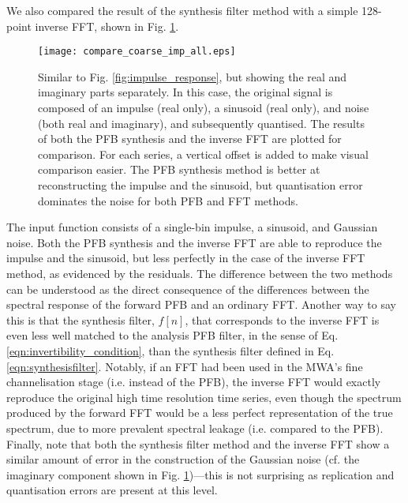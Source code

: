 \documentclass{pasa}%
\begin{document}
We also compared the result of the synthesis filter method with a simple 128-point inverse FFT, shown in Fig. \ref{fig:imp_sin_noise}.
\begin{figure}
    \centering
    \texttt{[image: compare\_coarse\_imp\_all.eps]}
    \caption{Similar to Fig. \ref{fig:impulse_response}, but showing the real and imaginary parts separately. In this case, the original signal is composed of an impulse (real only), a sinusoid (real only), and noise (both real and imaginary), and subsequently quantised. The results of both the PFB synthesis and the inverse FFT are plotted for comparison. For each series, a vertical offset is added to make visual comparison easier. The PFB synthesis method is better at reconstructing the impulse and the sinusoid, but quantisation error dominates the noise for both PFB and FFT methods.}
    \label{fig:imp_sin_noise}
\end{figure}
The input function consists of a single-bin impulse, a sinusoid, and Gaussian noise.
Both the PFB synthesis and the inverse FFT are able to reproduce the impulse and the sinusoid, but less perfectly in the case of the inverse FFT method, as evidenced by the residuals.
The difference between the two methods can be understood as the direct consequence of the differences between the spectral response of the forward PFB and an ordinary FFT.
Another way to say this is that the synthesis filter, $f[n]$, that corresponds to the inverse FFT is even less well matched to the analysis PFB filter, in the sense of Eq. \eqref{eqn:invertibility_condition}, than the synthesis filter defined in Eq. \eqref{eqn:synthesisfilter}.
Notably, if an FFT had been used in the MWA's fine channelisation stage (i.e. instead of the PFB), the inverse FFT would exactly reproduce the original high time resolution time series, even though the spectrum produced by the forward FFT would be a less perfect representation of the true spectrum, due to more prevalent spectral leakage (i.e. compared to the PFB).
Finally, note that both the synthesis filter method and the inverse FFT show a similar amount of error in the construction of the Gaussian noise (cf. the imaginary component shown in Fig. \ref{fig:imp_sin_noise})---this is not surprising as replication and quantisation errors are present at this level.
\end{document}
